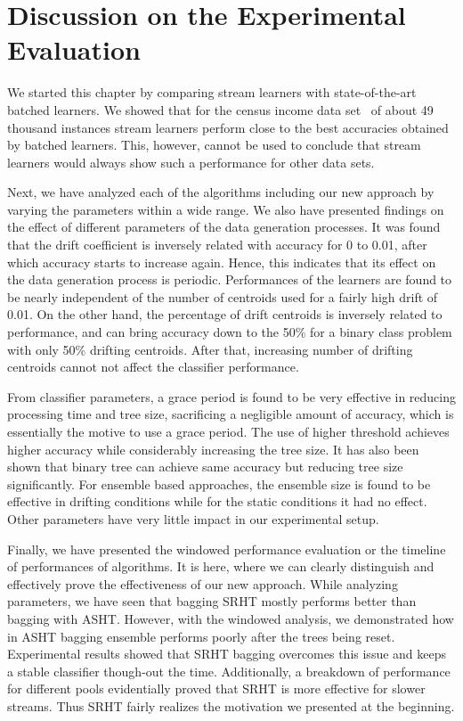 \section{Discussion on the Experimental Evaluation}
We started this chapter by comparing stream learners with state-of-the-art batched learners. We showed that for the census income data set~\cite{ron:adultds} of about 49 thousand instances stream learners perform close to the best accuracies obtained by batched learners. This, however, cannot be used to conclude that stream learners would always show such a performance for other data sets.

Next, we have analyzed each of the algorithms including our new approach by varying the parameters within a wide range. We also have presented findings on the effect of different parameters of the data generation processes. It was found that the drift coefficient is inversely related with accuracy for 0 to 0.01, after which accuracy starts to increase again. Hence, this indicates that its effect on the data generation process is periodic. Performances of the learners are found to be nearly independent of the number of centroids used for a fairly high drift of 0.01. On the other hand, the percentage of drift centroids is inversely related to performance, and can bring accuracy down to the 50\% for a binary class problem with only 50\% drifting centroids. After that, increasing number of drifting centroids cannot not affect the classifier performance. 

From classifier parameters, a grace period is found to be very effective in reducing processing time and tree size, sacrificing a negligible amount of accuracy, which is essentially the motive to use a grace period. The use of higher threshold achieves higher accuracy while considerably increasing the tree size. It has also been shown that binary tree can achieve same accuracy but reducing tree size significantly. For ensemble based approaches, the ensemble size is found to be effective in drifting conditions while for the static conditions it had no effect. Other parameters have very little impact in our experimental setup.

Finally, we have presented the windowed performance evaluation or the timeline of performances of algorithms. It is here, where we can clearly distinguish and effectively prove the effectiveness of our new approach. While analyzing parameters, we have seen that bagging SRHT mostly performs better than bagging with ASHT. However, with the windowed analysis, we demonstrated how in ASHT bagging ensemble performs poorly after the trees being reset. Experimental results showed that SRHT bagging overcomes this issue and keeps a stable classifier though-out the time. Additionally, a breakdown of performance for different pools evidentially proved that SRHT is more effective for slower streams. Thus SRHT fairly realizes the motivation we presented at the beginning.
